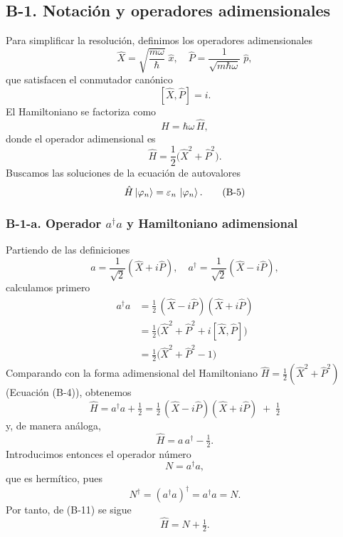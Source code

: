 \documentclass[a4paper,11pt]{article}
\begin{document}
\subsection*{B-1. Notación y operadores adimensionales}

Para simplificar la resolución, definimos los operadores adimensionales
\[
  \hat X = \sqrt{\frac{m\omega}{\hbar}}\;\hat x,
  \quad
  \hat P = \frac{1}{\sqrt{m\hbar\omega}}\;\hat p,
  \tag{B-1}
\]
que satisfacen el conmutador canónico
\[
  [\hat X,\hat P]=i.
  \tag{B-2}
\]
El Hamiltoniano se factoriza como
\[
  H = \hbar\omega\,\hat H,
  \tag{B-3}
\]
donde el operador adimensional es
\[
  \hat H = \frac12\bigl(\hat X^2 + \hat P^2\bigr).
  \tag{B-4}
\]
Buscamos las soluciones de la ecuación de autovalores
\[
  \hat H\ket{\varphi_n} = \varepsilon_n\,\ket{\varphi_n}.
  \tag{B-5}
\]

\subsubsection*{B-1-a. Operador \(a^\dagger a\) y Hamiltoniano adimensional}

Partiendo de las definiciones
\[
a = \frac{1}{\sqrt2}(\hat X + i\hat P), 
\quad
a^\dagger = \frac{1}{\sqrt2}(\hat X - i\hat P),
\]
calculamos primero
\begin{equation}
\begin{split}
a^\dagger a
&= \tfrac12\,(\hat X - i\hat P)(\hat X + i\hat P)\\
&= \tfrac12\bigl(\hat X^2 + \hat P^2 + i[\hat X,\hat P]\bigr)\\
&= \tfrac12\bigl(\hat X^2 + \hat P^2 -1\bigr)
\end{split}
\tag{B-10}
\end{equation}
Comparando con la forma adimensional del Hamiltoniano
\(\hat H = \tfrac12(\hat X^2 + \hat P^2)\) (Ecuación (B-4)), obtenemos
\begin{equation}
\hat H 
= a^\dagger a + \tfrac12
= \tfrac12\,(\hat X - i\hat P)(\hat X + i\hat P) \;+\;\tfrac12
\tag{B-11}
\end{equation}
y, de manera análoga,
\begin{equation}
\hat H = a\,a^\dagger - \tfrac12.
\tag{B-12}
\end{equation}
Introducimos entonces el operador número
\begin{equation}
N = a^\dagger a,
\tag{B-13}
\end{equation}
que es hermítico, pues
\begin{equation}
N^\dagger = (a^\dagger a)^\dagger = a^\dagger a = N.
\tag{B-14}
\end{equation}
Por tanto, de (B-11) se sigue
\begin{equation}
\hat H = N + \tfrac12.
\tag{B-15}
\end{equation}
\end{document}
